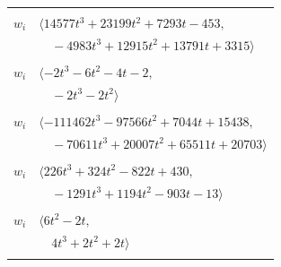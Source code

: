 \documentclass[11pt]{article}
\begin{document}
\begin{longtable}{@{}ll@{}}
\addlinespace[2pt]
\multicolumn{2}{@{}p{0.97\textwidth}@{}}{$i=32$, $D_i=128$, $\rho_{ij}$: $3{:}1, \allowbreak 9{:}2, \allowbreak 16{:}2, \allowbreak 18{:}1, \allowbreak 24{:}2, \allowbreak 25{:}1, \allowbreak 30{:}1, \allowbreak 31{:}1, \allowbreak 35{:}2, \allowbreak 36{:}2, \allowbreak 39{:}1, \allowbreak 40{:}1, \allowbreak 47{:}2$}\\
$w_i$ & $\langle 14577t^{3}+23199t^{2}+7293t-453,$\\
 & $\quad -4983t^{3}+12915t^{2}+13791t+3315\rangle$\\
\addlinespace[2pt]
\multicolumn{2}{@{}p{0.97\textwidth}@{}}{$i=33$, $D_i=2$, $\rho_{ij}$: $7{:}1, \allowbreak 10{:}2, \allowbreak 17{:}1, \allowbreak 23{:}2, \allowbreak 38{:}1$}\\
$w_i$ & $\langle -2t^{3}-6t^{2}-4t-2,$\\
 & $\quad -2t^{3}-2t^{2}\rangle$\\
\addlinespace[2pt]
\multicolumn{2}{@{}p{0.97\textwidth}@{}}{$i=34$, $D_i=512$, $\rho_{ij}$: $1{:}2, \allowbreak 5{:}1, \allowbreak 6{:}2, \allowbreak 7{:}1, \allowbreak 9{:}1, \allowbreak 10{:}2, \allowbreak 13{:}2, \allowbreak 15{:}1, \allowbreak 16{:}1, \allowbreak 20{:}1, \allowbreak 29{:}1, \allowbreak 47{:}2, \allowbreak 48{:}1$}\\
$w_i$ & $\langle -111462t^{3}-97566t^{2}+7044t+15438,$\\
 & $\quad -70611t^{3}+20007t^{2}+65511t+20703\rangle$\\
\addlinespace[2pt]
\multicolumn{2}{@{}p{0.97\textwidth}@{}}{$i=35$, $D_i=128$, $\rho_{ij}$: $2{:}1, \allowbreak 11{:}2, \allowbreak 17{:}1, \allowbreak 20{:}2, \allowbreak 21{:}2, \allowbreak 22{:}2, \allowbreak 27{:}1, \allowbreak 28{:}2, \allowbreak 32{:}1, \allowbreak 48{:}2, \allowbreak 54{:}2$}\\
$w_i$ & $\langle 226t^{3}+324t^{2}-822t+430,$\\
 & $\quad -1291t^{3}+1194t^{2}-903t-13\rangle$\\
\addlinespace[2pt]
\multicolumn{2}{@{}p{0.97\textwidth}@{}}{$i=36$, $D_i=2$, $\rho_{ij}$: $2{:}2, \allowbreak 19{:}1, \allowbreak 27{:}1, \allowbreak 28{:}1, \allowbreak 32{:}1, \allowbreak 40{:}2, \allowbreak 52{:}1$}\\
$w_i$ & $\langle 6t^{2}-2t,$\\
 & $\quad 4t^{3}+2t^{2}+2t\rangle$\\
\addlinespace[2pt]
\multicolumn{2}{@{}p{0.97\textwidth}@{}}{$i=37$, $D_i=4$, $\rho_{ij}$: $2{:}2, \allowbreak 5{:}2, \allowbreak 15{:}2, \allowbreak 16{:}2, \allowbreak 23{:}2, \allowbreak 26{:}1, \allowbreak 27{:}1, \allowbreak 28{:}1, \allowbreak 30{:}1, \allowbreak 31{:}2, \allowbreak 39{:}2, \allowbreak 42{:}1, \allowbreak 50{:}2$}\\

\end{longtable}
\end{document}
